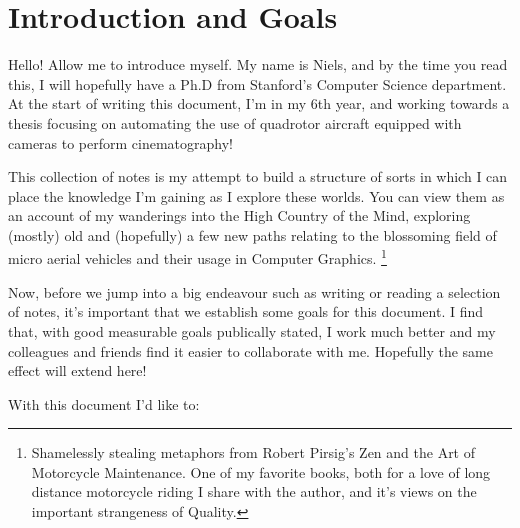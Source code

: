 \chapter{Introduction and Goals} 

Hello! Allow me to introduce myself. My name is Niels, and by the time you read this, I will hopefully have a Ph.D from Stanford's Computer Science department. At the start of writing this document, I'm in my 6th year, and working towards a thesis focusing on automating the use of quadrotor aircraft equipped with cameras to perform cinematography! 

This collection of notes is my attempt to build a structure of sorts in which I can place the knowledge I'm gaining as I explore these worlds. You can view them as an account of my wanderings into the High Country of the Mind\cite{Pirsig2005}, exploring (mostly) old and (hopefully) a few new paths relating to the blossoming field of micro aerial vehicles and their usage in Computer Graphics.  
 \footnote{Shamelessly stealing metaphors from Robert Pirsig's Zen and the Art of Motorcycle Maintenance. One of my favorite books, both for a love of long distance motorcycle riding I share with the author, and it's views on the important strangeness of Quality.}

Now, before we jump into a big endeavour such as writing or reading a selection of notes, it's important that we establish some goals for this document. I find that, with good measurable goals publically stated, I work much better and my colleagues and friends find it easier to collaborate with me. Hopefully the same effect will extend here!

With this document I'd like to:

